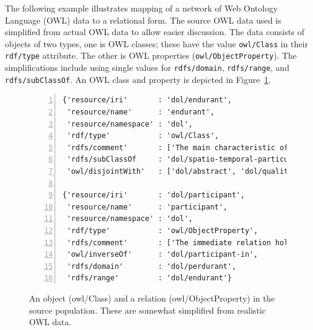 \documentclass[10pt,letterpaper]{article} %
\newcommand{\stt}[1]{\texttt{#1}} %
\begin{document}
The following example illustrates mapping of a network of Web Ontology Language (OWL) data to a relational form.
The source OWL data used is simplified from actual OWL data to allow easier discussion.
The data consists of objects of two types, one is OWL classes; these have the value  \stt{owl/Class} in their \stt{rdf/type} attribute.
The other is OWL properties (\stt{owl/ObjectProperty}).
The simplifications include using single values for \stt{rdfs/domain}, \stt{rdfs/range}, and \stt{rdfs/subClassOf}.
An OWL class and property is depicted in Figure~\ref{code:endurant}.

\begin{figure}[H]
  \caption{An object (owl/Class) and a relation (owl/ObjectProperty) in the source population.
    These are somewhat simplified from realistic OWL data.}
  \label{code:endurant}
\begin{lstlisting}[numberstyle=\scriptsize,basicstyle=\ttfamily\scriptsize,numbers=left,stepnumber=1,breaklines=true]
{'resource/iri'       : 'dol/endurant',
 'resource/name'      : 'endurant',
 'resource/namespace' : 'dol',
 'rdf/type'           : 'owl/Class',
 'rdfs/comment'       : ['The main characteristic of endurants is...'],
 'rdfs/subClassOf     : 'dol/spatio-temporal-particular',
 'owl/disjointWith'   : ['dol/abstract', 'dol/quality', 'dol/perdurant']}

{'resource/iri'       : 'dol/participant',
 'resource/name'      : 'participant',
 'resource/namespace' : 'dol',
 'rdf/type'           : 'owl/ObjectProperty',
 'rdfs/comment'       : ['The immediate relation holding between endurants and perdurants...'],
 'owl/inverseOf'      : 'dol/participant-in',
 'rdfs/domain'        : 'dol/perdurant',
 'rdfs/range'         : 'dol/endurant'}
\end{lstlisting}
\end{figure} \vspace{-3em}
\end{document}
